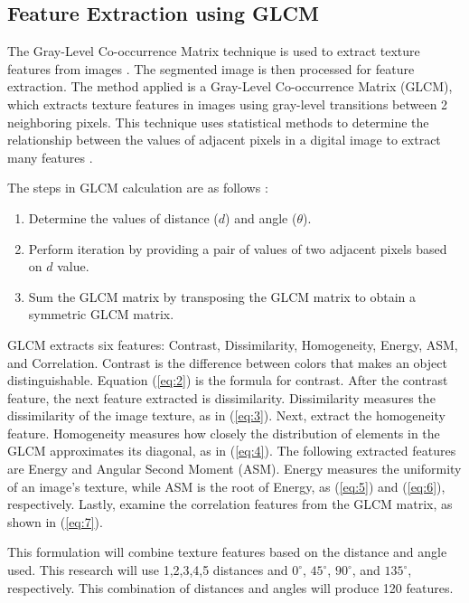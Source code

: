 \documentclass[10pt,a4paper]{article}
\begin{document}
\subsection{Feature Extraction using GLCM}

The Gray-Level Co-occurrence Matrix technique is used to extract texture features from images \cite{Utaminingrum2022}. The segmented image is then processed for feature extraction. The method applied is a Gray-Level Co-occurrence Matrix (GLCM), which extracts texture features in images using gray-level transitions between 2 neighboring pixels. This technique uses statistical methods to determine the relationship between the values of adjacent pixels in a digital image to extract many features \cite{Utaminingrum2023,Priyanka2020}. 

The steps in GLCM calculation are as follows \cite{Utaminingrum2023}:

\begin{enumerate}
    \item Determine the values of distance ($d$) and angle ($\theta$).
    \item Perform iteration by providing a pair of values of two adjacent pixels based on $d$ value.
    \item Sum the GLCM matrix by transposing the GLCM matrix to obtain a symmetric GLCM matrix.
\end{enumerate}

GLCM extracts six features: Contrast, Dissimilarity, Homogeneity, Energy, ASM, and Correlation. Contrast is the difference between colors that makes an object distinguishable. Equation (\ref{eq:2}) is the formula for contrast. After the contrast feature, the next feature extracted is dissimilarity. Dissimilarity measures the dissimilarity of the image texture, as in (\ref{eq:3}). Next, extract the homogeneity feature. Homogeneity measures how closely the distribution of elements in the GLCM approximates its diagonal, as in (\ref{eq:4}). The following extracted features are Energy and Angular Second Moment (ASM). Energy measures the uniformity of an image's texture, while ASM is the root of Energy, as (\ref{eq:5}) and (\ref{eq:6}), respectively. Lastly, examine the correlation features from the GLCM matrix, as shown in (\ref{eq:7}).

This formulation will combine texture features based on the distance and angle used. This research will use 1,2,3,4,5 distances and $0^\circ$, $45^\circ$, $90^\circ$, and $135^\circ$, respectively. This combination of distances and angles will produce 120 features.
\end{document}
